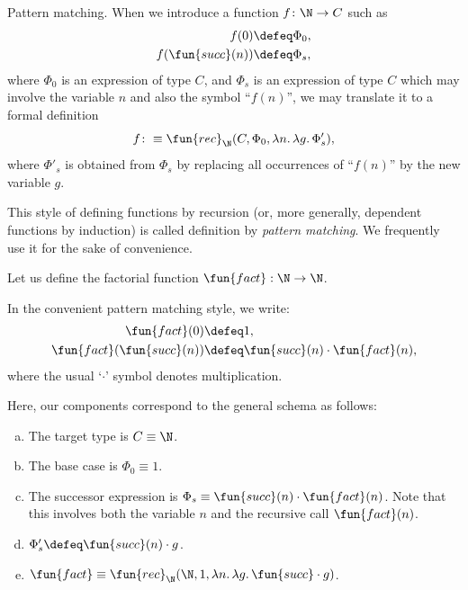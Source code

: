 \begin{lpar}{Pattern matching.}
    When we introduce a function $f\colon\N\to C$ such as
    \begin{align*}
        f(0) &\defeq \Phi_0,\\
        f(\fun{succ}(n)) &\defeq \Phi_s,
    \end{align*}
    where $\Phi_0$ is an expression of type $C$, and $\Phi_s$ is an expression of type $C$ which may involve the variable $n$ and also the symbol ``$f(n)$'', we may translate it to a formal definition
    \[
        f\colon\equiv\fun{rec}_\N(C,\Phi_0,\lambda n.\,
            \lambda g.\,\Phi'_s),
    \]
    where $\Phi'_s$ is obtained from $\Phi_s$ by replacing all occurrences of ``$f(n)$'' by the new variable $g$.
    
    This style of defining functions by recursion (or, more generally, dependent functions by induction) is called definition by \textsl{pattern matching}. We frequently use it for the sake of convenience.

    \begin{xmpl}
        Let us define the factorial function $\fun{fact} : \N \to \N$.

        In the convenient pattern matching style, we write:
        \begin{align*}
            \fun{fact}(0) &\defeq 1, \\
            \fun{fact}(\fun{succ}(n)) &\defeq \fun{succ}(n) \cdot \fun{fact}(n),
        \end{align*}
        where the usual `$\cdot$' symbol denotes multiplication.
        
        Here, our components correspond to the general schema as follows:
        \begin{enumerate}[a),font=\upshape]
            \item The target type is $C \equiv\N$.
            \item The base case is $\Phi_0 \equiv 1$.
            \item The successor expression is $\Phi_s \equiv \fun{succ}(n) \cdot \fun{fact}(n)$. Note that this involves both the variable $n$ and the recursive call $\fun{fact}(n)$.
            \item $\Phi'_s \defeq \fun{succ}(n) \cdot g$.
            \item $\fun{fact}\equiv\fun{rec}_\N(\N,1,\lambda n.\,\lambda g.\,\fun{succ}\cdot g)$.
        \end{enumerate}
    \end{xmpl}
\end{lpar}

